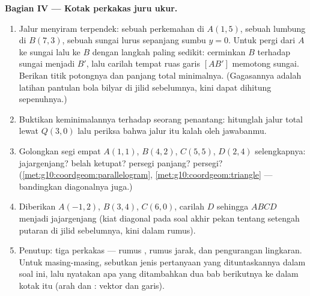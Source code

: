 \begin{problem}
\medskip
\noindent\textbf{Bagian IV --- Kotak perkakas juru ukur.}
\begin{enumerate}[resume]
  \item Jalur menyiram terpendek: sebuah perkemahan di $A(1, 5)$, sebuah
        lumbung di $B(7, 3)$, sebuah sungai lurus sepanjang sumbu $y = 0$.
        Untuk pergi dari $A$ ke sungai lalu ke $B$ dengan
        langkah paling sedikit: cerminkan $B$ terhadap sungai menjadi $B'$,
        lalu carilah tempat ruas garis $[AB']$ memotong sungai.
        Berikan titik potongnya dan panjang total minimalnya.
        (Gagasannya adalah latihan pantulan bola bilyar di jilid sebelumnya,
        kini dapat dihitung sepenuhnya.)
  \item Buktikan keminimalannya terhadap seorang penantang: hitunglah
        jalur total lewat $Q(3, 0)$ lalu periksa bahwa jalur itu kalah
        oleh jawabanmu.
  \item Golongkan segi empat $A(1,1)$, $B(4,2)$,
        $C(5,5)$, $D(2,4)$ selengkapnya: jajargenjang? belah ketupat?
        persegi panjang? persegi?
        (\cref{met:g10:coordgeom:parallelogram},
        \cref{met:g10:coordgeom:triangle} --- bandingkan diagonalnya
        juga.)
  \item Diberikan $A(-1, 2)$, $B(3, 4)$, $C(6, 0)$, carilah $D$ sehingga
        $ABCD$ menjadi jajargenjang (kiat  diagonal pada
        soal akhir pekan tentang setengah putaran di jilid sebelumnya, kini
        dalam rumus).
  \item Penutup: tiga perkakas --- rumus , rumus
        jarak, dan pengurangan  lingkaran. Untuk masing-masing,
        sebutkan jenis pertanyaan yang dituntaskannya dalam soal ini, lalu
        nyatakan apa yang ditambahkan dua bab berikutnya ke dalam kotak itu
        (arah dan : vektor dan  garis).

\end{enumerate}
\end{problem}
